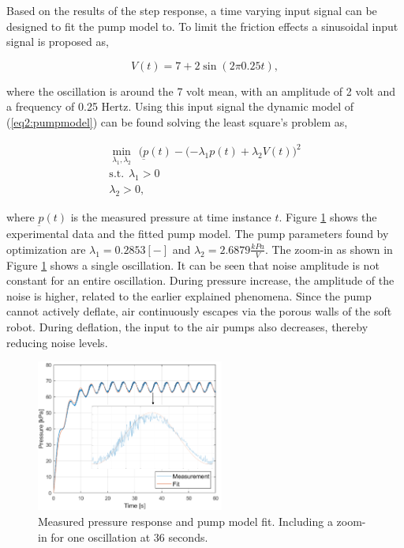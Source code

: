 Based on the results of the step response, a time varying input signal can be designed to fit the pump model to. To limit the friction effects a sinusoidal input signal is proposed as,

\begin{equation}
    V(t) =  7 + 2 \sin(2 \pi 0.25t),
    \label{eq3:vinput}
\end{equation}


where the oscillation is around the 7 volt mean, with an amplitude of 2 volt and a frequency of 0.25 Hertz. Using this input signal the dynamic model of (\ref{eq2:pumpmodel}) can be found solving the least square's problem as,

\begin{equation}
   \begin{aligned}
\min_{\lambda_1,\lambda_2} \hspace{5pt}  \Big(\underbar{p}(t) - (-\lambda_1 p(t) +\lambda_2 V(t)\Big)^2   \\ 
\text{s.t.} \hspace{5pt} \lambda_1 > 0 \\
\lambda_2 > 0,
\end{aligned}
\end{equation}

where $\underbar{p}(t)$ is the measured pressure at time instance $t$. Figure \ref{fig3:pumpfit} shows the experimental data and the fitted pump model. The pump parameters found by optimization are $\lambda_1 = 0.2853 [-]$ and $\lambda_2 = 2.6879 \frac{kPa}{V}$. The zoom-in as shown in Figure \ref{fig3:pumpfit} shows a single oscillation. It can be seen that noise amplitude is not constant for an entire oscillation. During pressure increase, the amplitude of the noise is higher, related to the earlier explained phenomena. Since the pump cannot actively deflate, air continuously escapes via the porous walls of the soft robot. During deflation, the input to the air pumps also decreases, thereby reducing noise levels. 

\begin{figure}[H]
    \centering
    \includegraphics[width = 0.55\textwidth]{Figures/Chapter3/expfitzoom.png}
    \caption{Measured pressure response and pump model fit. Including a zoom-in for one oscillation at 36 seconds.}
    \label{fig3:pumpfit}
\end{figure}


